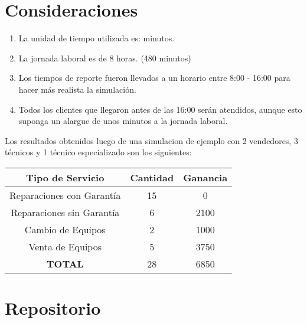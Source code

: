 \documentclass[a4paper,10pt,twocolumn]{article}
\begin{document}
\section{Consideraciones}

\begin{enumerate}
	\item La unidad de tiempo utilizada es: minutos.
	\item La jornada laboral es de 8 horas. (480 minutos)
	\item Los tiempos de reporte fueron llevados a un horario entre 8:00 - 16:00 para hacer más realista la simulación.
	\item Todos los clientes que llegaron antes de las 16:00 serán atendidos, aunque esto suponga un alargue de unos minutos a la jornada laboral.
\end{enumerate}

Los resultados obtenidos luego de una simulacion de ejemplo con 2 vendedores, 3 técnicos y 1 técnico especializado son los siguientes:

\begin{center}
	\begin{tabular}[t]{|c|c|c|}
		\hline
		Tipo de Servicio & Cantidad & Ganancia\\
		\hline \hline
		Reparaciones con Garantía & 15 & 0   \\ \hline
		Reparaciones sin Garantía & 6 & 2100 \\ \hline
		Cambio de Equipos & 2 & 1000         \\ \hline
		Venta de Equipos  & 5 & 3750         \\ \hline
		\hline
		\textbf{TOTAL} & 28 & 6850\\
		\hline
	\end{tabular}
\end{center}

\section{Repositorio}\label{sec:conc}
\end{document}
